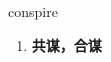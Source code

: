 
\begin{frame}
{\huge conspire}
\begin{center}
\begin{enumerate}\Large
  \item \textbf{共谋，合谋}
\end{enumerate}
\end{center}
\end{frame}
